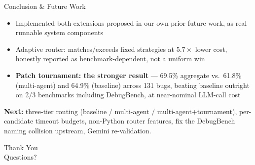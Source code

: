 \documentclass[aspectratio=169]{beamer}
\begin{document}
\begin{frame}{Conclusion \& Future Work}
\begin{itemize}
    \item Implemented both extensions proposed in our own prior future work, as real runnable system components
    \item Adaptive router: matches/exceeds fixed strategies at $5.7\times$ lower cost, honestly reported as benchmark-dependent, not a uniform win
    \item \textbf{Patch tournament: the stronger result} --- 69.5\% aggregate vs.\ 61.8\% (multi-agent) and 64.9\% (baseline) across 131 bugs, beating baseline outright on 2/3 benchmarks including DebugBench, at near-nominal LLM-call cost
\end{itemize}
\vspace{8pt}
\textbf{Next:} three-tier routing (baseline / multi-agent / multi-agent+tournament), per-candidate timeout budgets, non-Python router features, fix the DebugBench naming collision upstream, Gemini re-validation.
\end{frame}

\begin{frame}
\centering
\Large Thank You \\[8pt]
\normalsize Questions?
\end{frame}
\end{document}
